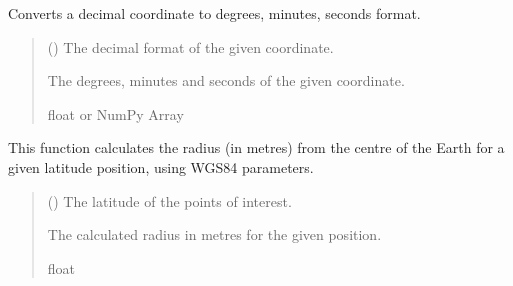 \documentclass[letterpaper,10pt,english]{sphinxmanual}
\begin{document}
\begin{fulllineitems}
\label{\detokenize{modules/util/transformations:qnav.util.transformations.dec2deg}}
\pysigstartsignatures
{}
\pysigstopsignatures
\sphinxAtStartPar
Converts a decimal coordinate to degrees, minutes, seconds format.
\begin{quote}\begin{description}
\sphinxAtStartPar
{} () \textendash{} The decimal format of the given coordinate.

\sphinxAtStartPar
The degrees, minutes and seconds of the given coordinate.

\sphinxAtStartPar
float or NumPy Array

\end{description}\end{quote}

\end{fulllineitems}


\begin{fulllineitems}
\label{\detokenize{modules/util/transformations:qnav.util.transformations.radius}}
\pysigstartsignatures
{}
\pysigstopsignatures
\sphinxAtStartPar
This function calculates the radius (in metres) from the centre of the
Earth for a given latitude position, using WGS84 parameters.
\begin{quote}\begin{description}
\sphinxAtStartPar
{} () \textendash{} The latitude of the points of interest.

\sphinxAtStartPar
The calculated radius in metres for the given position.

\sphinxAtStartPar
float

\end{description}\end{quote}

\end{fulllineitems}
\end{document}

